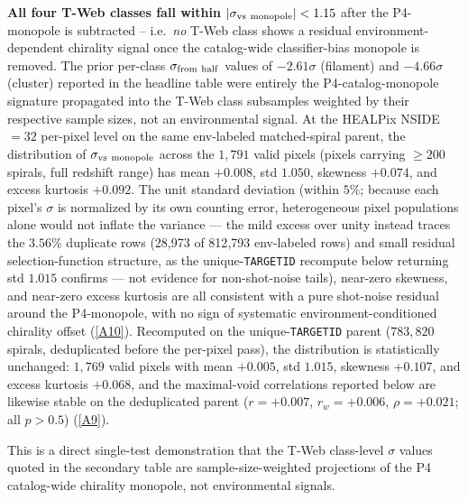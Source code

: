 \documentclass[aps,prd,twocolumn,superscriptaddress,showpacs,preprintnumbers,nofootinbib,longbibliography,floatfix]{revtex4-2}
\newcommand{\repoBase}{https://github.com/Hubify-Projects/bigbounce/blob/main}
\begin{document}
\textbf{All four T-Web classes fall within
$|\sigma_{\rm vs\ monopole}| < 1.15$} after the P4-monopole is
subtracted -- i.e.\ \emph{no} T-Web class shows a residual
environment-dependent chirality signal once the catalog-wide
classifier-bias monopole is removed. The prior per-class
$\sigma_{\rm from\ half}$ values of $-2.61\sigma$ (filament) and
$-4.66\sigma$ (cluster) reported in the headline table were entirely
the P4-catalog-monopole signature propagated into the T-Web class
subsamples weighted by their respective sample sizes, not an
environmental signal. At the HEALPix NSIDE $=32$ per-pixel level on
the same env-labeled matched-spiral parent, the distribution of
$\sigma_{\rm vs\ monopole}$ across the $1{,}791$ valid pixels
(pixels carrying $\ge 200$ spirals, full redshift range) has
mean $+0.008$, std $1.050$, skewness $+0.074$, and excess kurtosis
$+0.092$. The unit standard deviation (within $5\%$; because each
pixel's $\sigma$ is normalized by its own counting error,
heterogeneous pixel populations alone would not inflate the variance
--- the mild excess over unity instead traces the $3.56\%$ duplicate
rows (28{,}973 of 812{,}793 env-labeled rows) and small residual selection-function structure, as the
unique-\texttt{TARGETID} recompute below returning std $1.015$
confirms --- not evidence for non-shot-noise tails), near-zero
skewness, and near-zero excess kurtosis
are all consistent with a pure shot-noise residual
around the P4-monopole, with no sign of systematic
environment-conditioned chirality offset
(\href{\repoBase/pipelines/p5\_desi\_chirality/outputs/17\_v0151\_closure\_recomputes.json}{[A10]}).
Recomputed on the unique-\texttt{TARGETID} parent ($783{,}820$
spirals, deduplicated before the per-pixel pass), the distribution is
statistically unchanged: $1{,}769$ valid pixels with mean $+0.005$,
std $1.015$, skewness $+0.107$, and excess kurtosis $+0.068$, and the
maximal-void correlations reported below are likewise stable on the
deduplicated parent ($r = +0.007$, $r_w = +0.006$, $\rho = +0.021$;
all $p > 0.5$)
(\href{\repoBase/pipelines/p5\_desi\_chirality/outputs/22\_r24conf\_local\_batch.json}{[A9]}).

This is a direct single-test demonstration that
the T-Web class-level $\sigma$ values quoted in the secondary table
are sample-size-weighted projections of the P4 catalog-wide chirality
monopole, not environmental signals.
\end{document}
